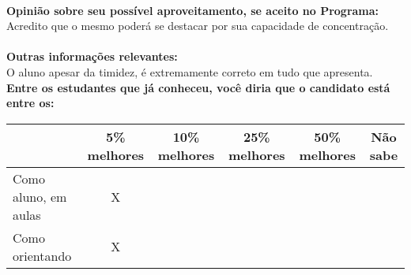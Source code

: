 \documentclass[11pt]{article}
\begin{document}
\\
\textbf{Opinião sobre seu possível aproveitamento, se aceito no Programa:}
\\Acredito que o mesmo poderá se destacar por sua capacidade de concentração.\\ 
\\
\textbf{Outras informações relevantes:} \\O aluno apesar da timidez, é extremamente correto em tudo que apresenta.
\\[0.3cm]
\textbf{Entre os estudantes que já conheceu, você diria que o candidato está entre os:}
\\
\begin{tabular}{|l|c|c|c|c|c|}
\hline
 & 5\% melhores & 10\% melhores & 25\% melhores & 50\% melhores & Não sabe \\
\hline
Como aluno, em aulas & X &  &  &  & \\
\hline
Como orientando & X &  &  &  & \\
\hline
\end{tabular}
\end{document}
